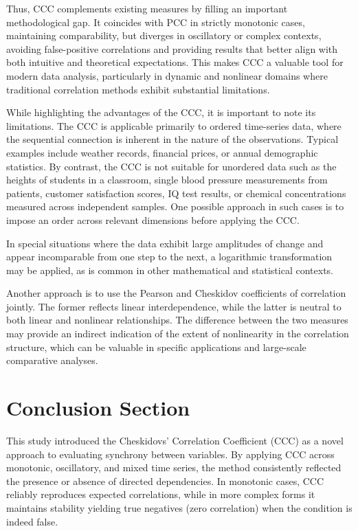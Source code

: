 \documentclass[aos]{imsart}
\begin{document}
Thus, CCC complements existing measures by filling an important methodological gap. It coincides with PCC in strictly monotonic cases, maintaining comparability, but diverges in oscillatory or complex contexts, avoiding false-positive correlations and providing results that better align with both intuitive and theoretical expectations. This makes CCC a valuable tool for modern data analysis, particularly in dynamic and nonlinear domains where traditional correlation methods exhibit substantial limitations.

While highlighting the advantages of the CCC, it is important to note its limitations. The CCC is applicable primarily to ordered time-series data, where the sequential connection is inherent in the nature of the observations. Typical examples include weather records, financial prices, or annual demographic statistics. By contrast, the CCC is not suitable for unordered data such as the heights of students in a classroom, single blood pressure measurements from patients, customer satisfaction scores, IQ test results, or chemical concentrations measured across independent samples. One possible approach in such cases is to impose an order across relevant dimensions before applying the CCC.

In special situations where the data exhibit large amplitudes of change and appear incomparable from one step to the next, a logarithmic transformation may be applied, as is common in other mathematical and statistical contexts.

Another approach is to use the Pearson and Cheskidov coefficients of correlation jointly. The former reflects linear interdependence, while the latter is neutral to both linear and nonlinear relationships. The difference between the two measures may provide an indirect indication of the extent of nonlinearity in the correlation structure, which can be valuable in specific applications and large-scale comparative analyses.

\section{Conclusion Section}

This study introduced the Cheskidovs’ Correlation Coefficient (CCC) as a novel approach to evaluating synchrony between variables. By applying CCC across monotonic, oscillatory, and mixed time series, the method consistently reflected the presence or absence of directed dependencies. In monotonic cases, CCC reliably reproduces expected correlations, while in more complex forms it maintains stability yielding true negatives (zero correlation) when the condition is indeed false.
\end{document}
